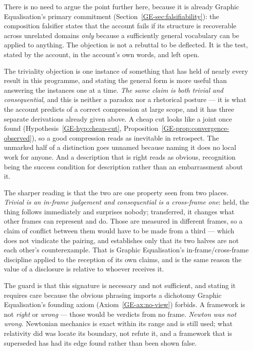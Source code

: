 \documentclass[11pt,a4paper]{article}
\begin{document}
There is no need to argue the point further here, because it is already Graphic Equalisation's primary
commitment (Section~\ref{GE-sec:falsifiability}): the composition falsifier states that the account fails if its structure is recoverable
across unrelated domains \emph{only} because a sufficiently general vocabulary can be applied to
anything. The objection is not a rebuttal to be deflected. It is the test, stated by the account, in
the account's own words, and left open.

The triviality objection is one instance of something that has held of nearly every result in this
programme, and stating the general form is more useful than answering the instances one at a time.
\emph{The same claim is both trivial and consequential}, and this is neither a paradox nor a rhetorical
posture --- it is what the account predicts of a correct compression at large scope, and it has three
separate derivations already given above. A cheap cut looks like a joint once found
(Hypothesis~\ref{GE-hyp:cheap-cut}, Proposition~\ref{GE-prop:convergence-observed}), so a good
compression reads as inevitable in retrospect. The unmarked half of a distinction goes unnamed because
naming it does no local work for anyone. And a description that is right reads as obvious, recognition
being the success condition for description rather than an embarrassment about it.

The sharper reading is that the two are one property seen from two places. \emph{Trivial is an in-frame
judgement and consequential is a cross-frame one}: held, the thing follows immediately and surprises
nobody; transferred, it changes what other frames can represent and do. Those are measured in different
frames, so a claim of conflict between them would have to be made from a third --- which does not
vindicate the pairing, and establishes only that its two halves are not each other's counterexample.
That is Graphic Equalisation's in-frame/cross-frame discipline applied to the reception of its own claims, and is the same reason the value of a disclosure is
relative to whoever receives it.

The guard is that this signature is necessary and not sufficient, and stating it requires care because
the obvious phrasing imports a dichotomy Graphic Equalisation's founding axiom
(Axiom~\ref{GE-ax:no-view}) forbids. A framework is not
\emph{right} or \emph{wrong} --- those would be verdicts from no frame. \emph{Newton was not wrong.}
Newtonian mechanics is exact within its range and is still used; what relativity did was locate its
boundary, not refute it, and a framework that is superseded has had its edge found rather than been
shown false.
\end{document}
